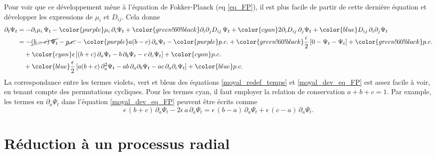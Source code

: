 \documentclass[openany,a4paper,12pt]{article}
\begin{document}
\par Pour voir que ce développement mène à l'équation de Fokker-Planck (eq \ref{eq_FP}), il est plus facile de partir de cette dernière équation et développer les expressions de $\mu_i$ et $D_{ij}$. Cela donne
%
\begin{equation}\label{moyal_dev_eq_FP}
\begin{split}
	\partial_t \Psi_t
	&= - \partial_i \mu_i \, \Psi_t
	- {\color{purple} \mu_i \, \partial_i \Psi_t }
	+ {\color{green!60!black} \partial_i\partial_j D_{ij} \, \Psi_t }
	+ {\color{cyan} 2 \partial_i D_{ij} \, \partial_j \Psi_t }
	+ {\color{blue} D_{ij} \,  \partial_i\partial_j \Psi_t } \\
	&= - \cancel{(b-c) \, \Psi_t} - \cancel{p.c.}
	- {\color{purple} a(b-c)\, \partial_a \Psi_t }
	- {\color{purple} p.c. }
	+ {\color{green!60!black} \frac \epsilon 2 \, [0-\Psi_t-\Psi_t] }
	+ {\color{green!60!black} p.c. } \\
	&\quad + {\color{cyan} \epsilon \, [ (b+c) \, \partial_a \Psi_t - b \, \partial_b \Psi_t - c \, \partial_c \Psi_t ] }
	+ {\color{cyan} p.c. } \\
	&\quad + {\color{blue} \frac \epsilon 2 \, [ a(b+c) \, \partial_a^2 \Psi_t - ab \, \partial_a\partial_b \Psi_t - ac \, \partial_a\partial_c \Psi_t ] }
	+ {\color{blue} p.c. }
\end{split} 
\end{equation}
%
La correspondance entre les termes violets, vert et bleus des équations \ref{moyal_redef_temps} et \ref{moyal_dev_eq_FP} est assez facile à voir, en tenant compte des permutations cycliques. Pour les termes cyan, il faut employer la relation de conservation $a+b+c=1$. Par example, les termes en $\partial_a\Psi_t$ dans l'équation \ref{moyal_dev_eq_FP} peuvent être écrits comme
%
\begin{equation}\label{moyal_terme_cyan_corresp}
	\epsilon\, (b+c)\, \partial_a\Psi_t -2\epsilon\, a\, \partial_a\Psi_t = \epsilon\, (b-a)\, \partial_a\Psi_t + \epsilon\, (c-a)\, \partial_a\Psi_t.
\end{equation}
%

\section{Réduction à un processus radial}
\label{section_stoch_averaging}
\end{document}
